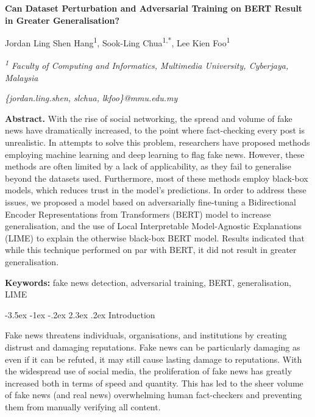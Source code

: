 \documentclass[
]{article}
\author{}
\date{}
\makeatletter
\renewcommand\section{\@startsection{section}{1}{\z@}%
  {-3.5ex \@plus -1ex \@minus -.2ex}%
  {2.3ex \@plus .2ex}%
  {\normalfont\fontsize{12}{14}\selectfont\bfseries}}
\makeatother
\begin{document}
\begin{center}
{\fontsize{14}{17}\selectfont\bfseries Can Dataset Perturbation and Adversarial Training on BERT Result in Greater Generalisation? \par}
\vspace{12pt}
{\fontsize{10}{12}\selectfont Jordan Ling Shen Hang\textsuperscript{1}, Sook-Ling Chua\textsuperscript{1,*}, Lee Kien Foo\textsuperscript{1}\par}
\vspace{8pt}

\textit{\textsuperscript{1} Faculty of Computing and Informatics, Multimedia University, Cyberjaya, Malaysia}
\vspace{4pt}

{\fontsize{9}{11}\selectfont\textit{\{jordan.ling.shen, slchua, lkfoo\}@mmu.edu.my}\par}
\end{center}
\vspace{8pt}

\noindent\textbf{Abstract.} With the rise of social networking, the spread and volume of fake news have dramatically increased, to the point where fact-checking every post is unrealistic. In attempts to solve this problem, researchers have proposed methods employing machine learning and deep learning to flag fake news. However, these methods are often limited by a lack of applicability, as they fail to generalise beyond the datasets used. Furthermore, most of these methods employ black-box models, which reduces trust in the model's predictions. In order to address these issues, we proposed a model based on adversarially fine-tuning a Bidirectional Encoder Representations from Transformers (BERT) model to increase generalisation, and the use of Local Interpretable Model-Agnostic Explanations (LIME) to explain the otherwise black-box BERT model. Results indicated that while this technique performed on par with BERT, it did not result in greater generalisation.
\vspace{4pt}

\noindent\textbf{Keywords:} fake news detection, adversarial training, BERT, generalisation, LIME

\section{Introduction}

Fake news threatens individuals, organisations, and institutions by creating distrust and damaging reputations. Fake news can be particularly damaging as even if it can be refuted, it may still cause lasting damage to reputations. With the widespread use of social media, the proliferation of fake news has greatly increased both in terms of speed and quantity. This has led to the sheer volume of fake news (and real news) overwhelming human fact-checkers and preventing them from manually verifying all content. 
\end{document}

